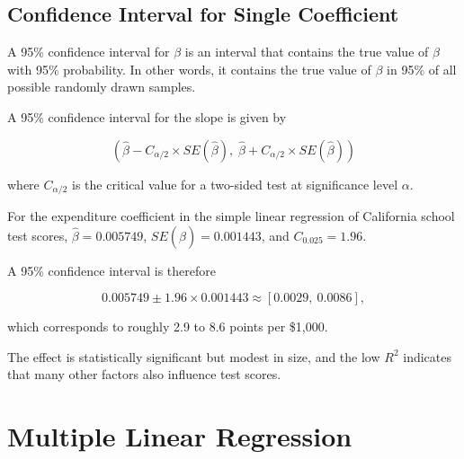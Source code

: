 \documentclass[
  12pt,
  a4paper,
]{scrbook}
\theoremstyle{plain}
\theoremstyle{definition}
\theoremstyle{remark}
\begin{document}
\section{Confidence Interval for Single
Coefficient}\label{confidence-interval-for-single-coefficient}

A 95\% confidence interval for \(\beta\) is an interval that contains
the true value of \(\beta\) with 95\% probability. In other words, it
contains the true value of \(\beta\) in 95\% of all possible randomly
drawn samples.

A 95\% confidence interval for the slope is given by

\[
\left(\hat{\beta}-C_{\alpha/2}\times SE(\hat{\beta}),\; \hat{\beta}+C_{\alpha/2}\times SE(\hat{\beta})\right)
\]

where \(C_{\alpha/2}\) is the critical value for a two-sided test at
significance level \(\alpha\).

For the expenditure coefficient in the simple linear regression of
California school test scores, \(\hat{\beta}=0.005749\),
\(SE(\hat{\beta})=0.001443\), and \(C_{0.025}=1.96\).

A 95\% confidence interval is therefore

\[
0.005749 \pm 1.96\times 0.001443 \approx [0.0029,\ 0.0086],
\]

which corresponds to roughly 2.9 to 8.6 points per {\$1,000}.

The effect is statistically significant but modest in size, and the low
\(R^2\) indicates that many other factors also influence test scores.

\chapter{Multiple Linear Regression}\label{multiple-linear-regression}
\end{document}
